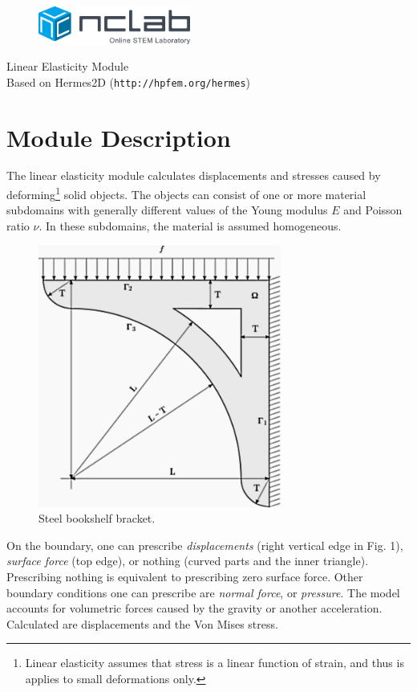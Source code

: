 \documentclass{article}
\begin{document}
\large

\vbox{}
\vspace{-2cm}
\begin{figure}[!ht]
\includegraphics[width=5cm]{img/logo.png}
\vspace{4mm}
\end{figure}
\noindent
\begin{center}
{\Huge Linear Elasticity Module}\\[2mm]
Based on Hermes2D ({\tt http://hpfem.org/hermes})\\[6mm]
\end{center}
\section{Module Description}

The linear elasticity module calculates displacements and stresses 
caused by deforming\footnote{Linear elasticity assumes that stress is a linear function of strain, and thus is applies to small deformations only.} solid objects. 
The objects can consist of one or more material subdomains with generally different values of the Young modulus $E$ and 
Poisson ratio $\nu$. In these subdomains, the material is assumed homogeneous.

\begin{figure}[!ht]
\begin{center}
\includegraphics[width=8cm]{img/elastsample1.png}
\caption{Steel bookshelf bracket.}
\vspace{4mm}
\end{center}
\end{figure}
\noindent
On the boundary, one can prescribe {\em displacements} (right vertical edge 
in Fig. 1), {\em surface force} (top edge), or nothing (curved parts and the 
inner triangle). Prescribing nothing is equivalent to prescribing zero surface force.
Other boundary conditions one can prescribe are {\em normal force}, or {\em pressure}.
The model accounts for volumetric forces caused by the gravity or another acceleration. 
Calculated are displacements and the Von Mises stress.
\end{document}
